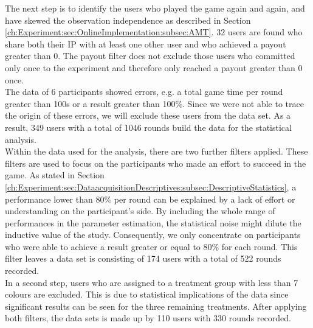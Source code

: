 The next step is to identify the users who played the game again and again, and have skewed the observation independence as described in Section \ref{ch:Experiment:sec:OnlineImplementation:subsec:AMT}. 32 users are found who share both their IP with at least one other user and who achieved a payout greater than 0. The payout filter does not exclude those users who committed only once to the experiment and therefore only reached a payout greater than 0 once. \\
The data of 6 participants showed errors, e.g. a total game time per round greater than 100s or a result greater than 100\%. Since we were not able to trace the origin of these errors, we will exclude these users from the data set.
As a result, 349 users with a total of 1046 rounds build the data for the statistical analysis.\\
Within the data used for the analysis, there are two further filters applied.
These filters are used to focus on the participants who made an effort to succeed in the game. As stated in Section \ref{ch:Experiment:sec:DataacquisitionDescriptives:subsec:DescriptiveStatistics}, a performance lower than 80\% per round can be explained by a lack of effort or understanding on the participant's side. By including the whole range of performances in the parameter estimation, the statistical noise might dilute the inductive value of the study. Consequently, we only concentrate on participants who were able to achieve a result greater or equal to 80\% for each round. This filter leaves a data set is consisting of 174 users with a total of 522 rounds recorded.\\
In a second step, users who are assigned to a treatment group with less than 7 colours are excluded. This is due to statistical implications of the data since significant results can be seen for the three remaining treatments. After applying both filters, the data sets is made up by 110 users with 330 rounds recorded.
%
%
%
%
%
%

